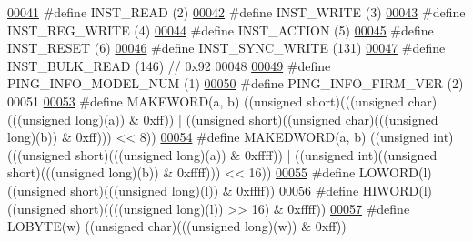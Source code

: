 \begin{DoxyCode}
\hypertarget{dynamixel_8h_source_l00041}{}\hyperlink{dynamixel_8h_a60599b6587736bb05efb8ea3c5e5f87f}{00041} \textcolor{preprocessor}{#define INST\_READ           (2)}
\hypertarget{dynamixel_8h_source_l00042}{}\hyperlink{dynamixel_8h_a1c304d06170982719fd605a87c9101f0}{00042} \textcolor{preprocessor}{#define INST\_WRITE          (3)}
\hypertarget{dynamixel_8h_source_l00043}{}\hyperlink{dynamixel_8h_ae2afd415cd9007f4688bf77507f0383e}{00043} \textcolor{preprocessor}{#define INST\_REG\_WRITE      (4)}
\hypertarget{dynamixel_8h_source_l00044}{}\hyperlink{dynamixel_8h_adea21b73305aa7a5b3317e299c616853}{00044} \textcolor{preprocessor}{#define INST\_ACTION         (5)}
\hypertarget{dynamixel_8h_source_l00045}{}\hyperlink{dynamixel_8h_ad670526ca941302efb4a0d00e7dd43c0}{00045} \textcolor{preprocessor}{#define INST\_RESET          (6)}
\hypertarget{dynamixel_8h_source_l00046}{}\hyperlink{dynamixel_8h_aeaa4b61ee11d45bd1a0cb932d7abaf77}{00046} \textcolor{preprocessor}{#define INST\_SYNC\_WRITE     (131)}
\hypertarget{dynamixel_8h_source_l00047}{}\hyperlink{dynamixel_8h_a7967a17d10e9100ffb48ca542ba7587f}{00047} \textcolor{preprocessor}{#define INST\_BULK\_READ      (146)  // 0x92}
00048 
\hypertarget{dynamixel_8h_source_l00049}{}\hyperlink{dynamixel_8h_addfe8da7a67888c0c7718cdd2f2ddfd4}{00049} \textcolor{preprocessor}{#define PING\_INFO\_MODEL\_NUM   (1)}
\hypertarget{dynamixel_8h_source_l00050}{}\hyperlink{dynamixel_8h_a2567de0a1d75cc4dfd4b0cf1abf425c9}{00050} \textcolor{preprocessor}{#define PING\_INFO\_FIRM\_VER    (2)}
00051     
\hypertarget{dynamixel_8h_source_l00053}{}\hyperlink{dynamixel_8h_a6b98c16b8e3e7733dd4063d0b0fac24c}{00053} \textcolor{preprocessor}{#define MAKEWORD(a, b)      ((unsigned short)(((unsigned char)(((unsigned long)(a)) & 0xff)) | ((unsigned
       short)((unsigned char)(((unsigned long)(b)) & 0xff))) << 8))}
\hypertarget{dynamixel_8h_source_l00054}{}\hyperlink{dynamixel_8h_a84e53a3db3f2ef95c6085d6f3531ae0e}{00054} \textcolor{preprocessor}{#define MAKEDWORD(a, b)     ((unsigned int)(((unsigned short)(((unsigned long)(a)) & 0xffff)) | ((unsigned
       int)((unsigned short)(((unsigned long)(b)) & 0xffff))) << 16))}
\hypertarget{dynamixel_8h_source_l00055}{}\hyperlink{dynamixel_8h_a00be6c40bc7a1297ada4d47a028066b8}{00055} \textcolor{preprocessor}{#define LOWORD(l)           ((unsigned short)(((unsigned long)(l)) & 0xffff))}
\hypertarget{dynamixel_8h_source_l00056}{}\hyperlink{dynamixel_8h_aeb28b2d61bd674900a89bfb77e28ae07}{00056} \textcolor{preprocessor}{#define HIWORD(l)           ((unsigned short)((((unsigned long)(l)) >> 16) & 0xffff))}
\hypertarget{dynamixel_8h_source_l00057}{}\hyperlink{dynamixel_8h_a04c0416272e5c07bdf955d803a21688e}{00057} \textcolor{preprocessor}{#define LOBYTE(w)           ((unsigned char)(((unsigned long)(w)) & 0xff))}

\end{DoxyCode}
